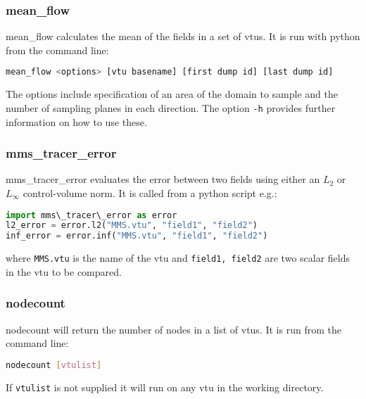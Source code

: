  
\subsubsection{mean\_flow}
\label{sect:mean_flow}

mean\_flow calculates the mean of the fields in a set of vtus. It is run with python from the command line:
\begin{lstlisting}[language = Bash]
mean_flow <options> [vtu basename] [first dump id] [last dump id]
\end{lstlisting}
The options include specification of an area of the domain to sample and the number of sampling planes in each direction. The option \lstinline[language = Bash]+-h+ provides further information on how to use these.


\subsubsection{mms\_tracer\_error}
\label{sect:mms_tracer_error}

mms\_tracer\_error evaluates the error between two fields using either an $L_2$ or $L_\infty$ control-volume norm. It is called from a python script e.g.:
\begin{lstlisting}[language = python]
import mms\_tracer\_error as error
l2_error = error.l2("MMS.vtu", "field1", "field2")
inf_error = error.inf("MMS.vtu", "field1", "field2")
\end{lstlisting}
where \lstinline[language = python]+MMS.vtu+ is the name of the vtu and \lstinline[language = python]+field1, field2+ are two scalar fields in the vtu to be compared.


\subsubsection{nodecount}
\label{sect:nodecount}
nodecount will return the number of nodes in a list of vtus. It is run from the command line:
\begin{lstlisting}[language = Bash]
nodecount [vtulist]
\end{lstlisting}
If \lstinline[language = Bash]+vtulist+ is not supplied it will run on any vtu in the working directory.

